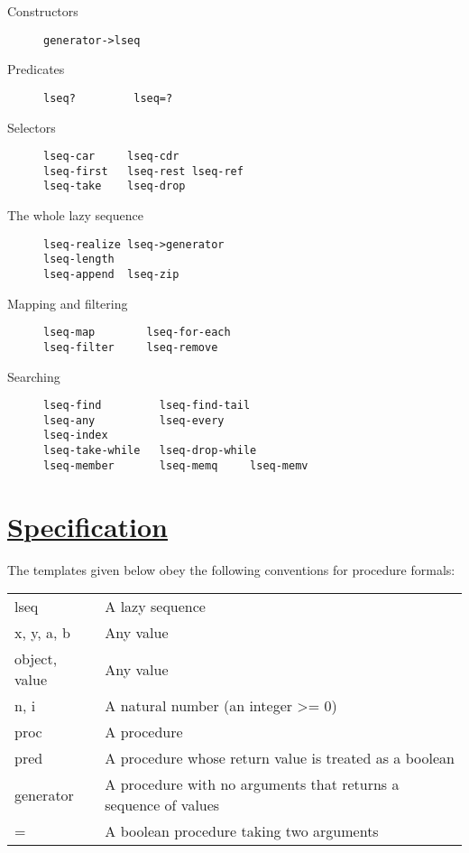 \begin{description}
\item[ Constructors ]
\begin{verbatim}
generator->lseq 
\end{verbatim}
\item[ Predicates ]
\begin{verbatim}
lseq?         lseq=?
\end{verbatim}
\item[ Selectors ]
\begin{verbatim}
lseq-car     lseq-cdr
lseq-first   lseq-rest lseq-ref
lseq-take    lseq-drop   
\end{verbatim}
\item[ The whole lazy sequence ]
\begin{verbatim}
lseq-realize lseq->generator
lseq-length
lseq-append  lseq-zip
\end{verbatim}
\item[ Mapping and filtering ]
\begin{verbatim}
lseq-map        lseq-for-each
lseq-filter     lseq-remove
\end{verbatim}
\item[ Searching ]
\begin{verbatim}
lseq-find         lseq-find-tail 
lseq-any          lseq-every
lseq-index
lseq-take-while   lseq-drop-while
lseq-member       lseq-memq     lseq-memv
\end{verbatim}
\end{description}

\section{\texorpdfstring{\href{}{Specification}}{Specification}}\label{specification}

The templates given below obey the following conventions for procedure
formals:

\begin{longtable}[]{@{}ll@{}}
\toprule
lseq & A lazy sequence\tabularnewline
x, y, a, b & Any value\tabularnewline
object, value & Any value\tabularnewline
n, i & A natural number (an integer \textgreater{}= 0)\tabularnewline
proc & A procedure\tabularnewline
pred & A procedure whose return value is treated as a
boolean\tabularnewline
generator & A procedure with no arguments that returns a sequence of
values\tabularnewline
= & A boolean procedure taking two arguments\tabularnewline
\bottomrule
\end{longtable}

